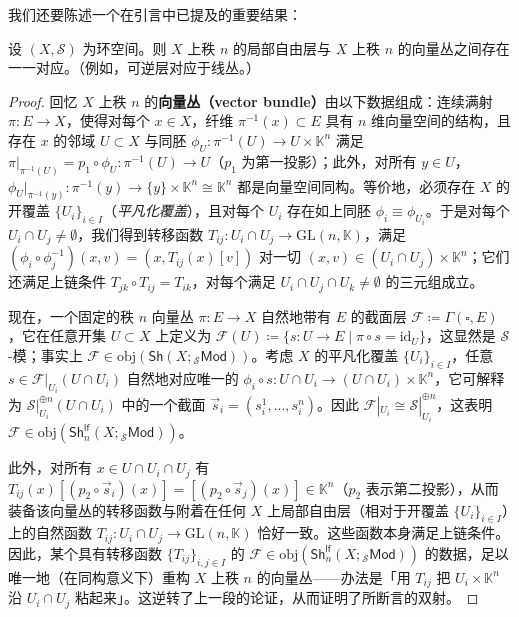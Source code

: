 我们还要陈述一个在引言中已提及的重要结果：

\begin{Pro}\label{locfreeisvectorbundle}
设 $(X,\mathcal{S})$ 为环空间。则 $X$ 上秩 $n$ 的局部自由层与 $X$ 上秩 $n$ 的向量丛之间存在一一对应。\textup{（例如，可逆层对应于线丛。）}
\end{Pro}

\begin{proof}
回忆 $X$ 上秩 $n$ 的\textbf{向量丛（vector bundle）}由以下数据组成：连续满射 $\pi:E\rightarrow X$，使得对每个 $x\in X$，纤维 $\pi^{-1}(x)\subset E$ 具有 $n$ 维向量空间的结构，且存在 $x$ 的邻域 $U\subset X$ 与同胚 $\phi_{U}:\pi^{-1}(U)\rightarrow U\times\mathbb{K}^n$ 满足 $\pi|_{\pi^{-1}(U)}=p_1\circ\phi_U:\pi^{-1}(U)\rightarrow U$（$p_1$ 为第一投影）；此外，对所有 $y\in U$，$\phi_{U}|_{\pi^{-1}(y)}:\pi^{-1}(y)\rightarrow \{y\}\times\mathbb{K}^n\cong\mathbb{K}^n$ 都是向量空间同构。等价地，必须存在 $X$ 的开覆盖 $\{U_i\}_{i\in I}$（\textit{平凡化覆盖}），且对每个 $U_i$ 存在如上同胚 $\phi_i\equiv\phi_{U_i}$。于是对每个 $U_i\cap U_j\neq\emptyset$，我们得到转移函数 $T_{ij}:U_i\cap U_j\rightarrow\text{GL}(n,\mathbb{K})$，满足 $(\phi_i\circ \phi_j^{-1})(x,v)=(x,T_{ij}(x)[v])$ 对一切 $(x,v)\in (U_i\cap U_j)\times\mathbb{K}^n$；它们还满足上链条件 $T_{jk}\circ T_{ij}=T_{ik}$，对每个满足 $U_i\cap U_j\cap U_k\neq \emptyset$ 的三元组成立。

现在，一个固定的秩 $n$ 向量丛 $\pi:E\rightarrow X$ 自然地带有 $E$ 的截面层 $\mathcal{F}\coloneqq\Gamma(\square, E)$，它在任意开集 $U\subset X$ 上定义为 $\mathcal{F}(U)\coloneqq\{s:U\rightarrow E\mid \pi\circ s=\text{id}_U\}$，这显然是 $\mathcal{S}$-模；事实上 $\mathcal{F}\in\text{obj}(\mathsf{Sh}(X;{}_\mathcal{S}\mathsf{Mod}))$。考虑 $X$ 的平凡化覆盖 $\{U_i\}_{i\in I}$，任意 $s\in\mathcal{F}|_{U_i}(U\cap U_i)$ 自然地对应唯一的 $\phi_i\circ s:U\cap U_i\rightarrow (U\cap U_i)\times\mathbb{K}^n$，它可解释为 $\mathcal{S}|_{U_i}^{\oplus n}(U\cap U_i)$ 中的一个截面 $\vec{s}_i=(s_i^1,...,s_i^n)$。因此 $\mathcal{F}|_{U_i}\cong\mathcal{S}|_{U_i}^{\oplus n}$，这表明 $\mathcal{F}\in\text{obj}(\mathsf{Sh}_n^\mathsf{lf}(X;{}_\mathcal{S}\mathsf{Mod}))$。

此外，对所有 $x\in U\cap U_i\cap U_j$ 有 $T_{ij}(x)[(p_2\circ\vec{s}_i)(x)]=[(p_2\circ\vec{s}_j)(x)]\in\mathbb{K}^n$（$p_2$ 表示第二投影），从而装备该向量丛的转移函数与附着在任何 $X$ 上局部自由层（相对于开覆盖 $\{U_i\}_{i\in I}$）上的自然函数 $T_{ij}:U_i\cap U_j\rightarrow\text{GL}(n,\mathbb{K})$ 恰好一致。这些函数本身满足上链条件。因此，某个具有转移函数 $\{T_{ij}\}_{i,j\in I}$ 的 $\mathcal{F}\in\text{obj}(\mathsf{Sh}_n^\mathsf{lf}(X;{}_\mathcal{S}\mathsf{Mod}))$ 的数据，足以唯一地（在同构意义下）重构 $X$ 上秩 $n$ 的向量丛——办法是「用 $T_{ij}$ 把 $U_i\times\mathbb{K}^n$ 沿 $U_i\cap U_j$ 粘起来」。这逆转了上一段的论证，从而证明了所断言的双射。
\end{proof}

